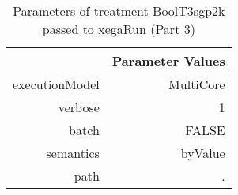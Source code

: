 \begin{table}[ht]
\centering
\begin{tabular}{rr}
  \hline
 & Parameter Values \\ 
  \hline
executionModel & MultiCore \\ 
  verbose & 1 \\ 
  batch & FALSE \\ 
  semantics & byValue \\ 
  path & . \\ 
   \hline
\end{tabular}
\caption{ Parameters of treatment BoolT3sgp2k passed to xegaRun
 (Part 3)} 
\end{table}
